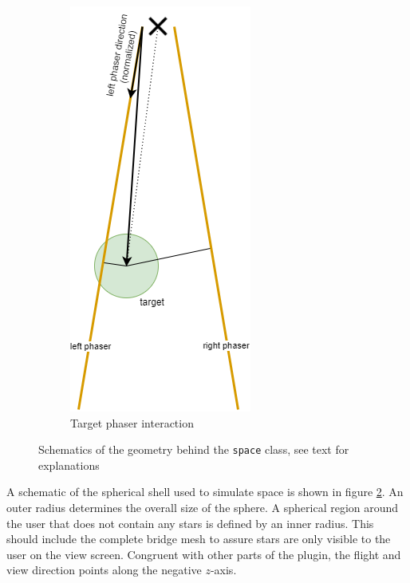 \documentclass[hyperref, bachelorofscience]{cgvpub}
\begin{document}
\begin{figure}[b!]
\begin{subfigure}{.34\linewidth}
		\includegraphics[width=.8\linewidth]{../pics/phasers}
		\caption{Target phaser interaction}
		\label{fig:space:phaser}
	\end{subfigure}
	\caption{Schematics of the geometry behind the \lstinline|space| class, see text for explanations}
	\label{fig:space}
\end{figure}

A schematic of the spherical shell used to simulate space is shown in figure \ref{fig:space}. An outer radius determines the overall size of the sphere. A spherical region around the user that does not contain any stars is defined by an inner radius. This should include the complete bridge mesh to assure stars are only visible to the user on the view screen. Congruent with other parts of the plugin, the flight and view direction points along the negative $ z $-axis. 
\end{document}
